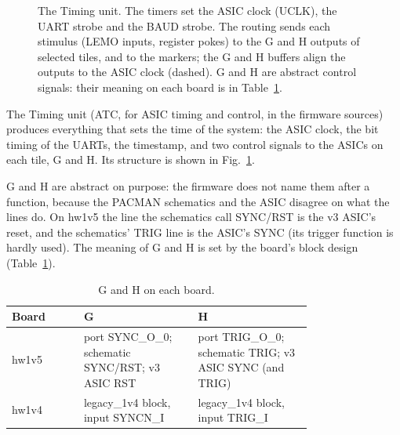 \documentclass[12pt]{article}
\begin{document}
\begin{figure}[htbp]
\caption{\label{fig:atc-unit} The Timing unit.  The timers set the ASIC clock (UCLK), the UART strobe and the
  BAUD strobe.  The routing sends each stimulus (LEMO inputs, register pokes) to the G and H outputs of
  selected tiles, and to the markers; the G and H buffers align the outputs to the ASIC clock (dashed).  G
  and H are abstract control signals: their meaning on each board is in Table~\ref{tab:atc-gh}.}
\end{figure}

The Timing unit (ATC, for ASIC timing and control, in the firmware sources) produces everything that sets
the time of the system: the ASIC clock, the bit timing of the UARTs, the timestamp, and two control
signals to the ASICs on each tile, G and H.  Its structure is shown in Fig.~\ref{fig:atc-unit}.

G and H are abstract on purpose: the firmware does not name them after a function, because the PACMAN
schematics and the ASIC disagree on what the lines do.  On hw1v5 the line the schematics call SYNC/RST is the
v3 ASIC's reset, and the schematics' TRIG line is the ASIC's SYNC (its trigger function is hardly used).  The
meaning of G and H is set by the board's block design (Table~\ref{tab:atc-gh}).

\begin{table}[H]
\centering
\caption{\label{tab:atc-gh} G and H on each board.}
\begin{tabular}{@{}l>{\raggedright\arraybackslash}p{0.38\linewidth}>{\raggedright\arraybackslash}p{0.38\linewidth}@{}}
\toprule
Board & G & H \\
\midrule
hw1v5 & port SYNC\_O\_0; schematic SYNC/RST; v3 ASIC RST & port TRIG\_O\_0; schematic TRIG; v3 ASIC SYNC (and TRIG) \\
hw1v4 & legacy\_1v4 block, input SYNCN\_I & legacy\_1v4 block, input TRIG\_I \\
\bottomrule
\end{tabular}
\end{table}
\end{document}
